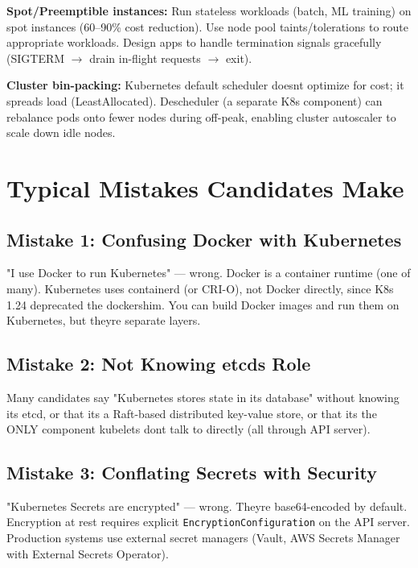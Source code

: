 \documentclass[11pt]{article}
\begin{document}
\textbf{Spot/Preemptible instances:} Run stateless workloads (batch, ML training) on spot instances (60--90\% cost reduction). Use node pool taints/tolerations to route appropriate workloads. Design apps to handle termination signals gracefully (SIGTERM \(\rightarrow\) drain in-flight requests \(\rightarrow\) exit).

\textbf{Cluster bin-packing:} Kubernetes default scheduler doesn\textquotesingle t optimize for cost; it spreads load (LeastAllocated). Descheduler (a separate K8s component) can rebalance pods onto fewer nodes during off-peak, enabling cluster autoscaler to scale down idle nodes.

\section{Typical Mistakes Candidates Make}\label{typical-mistakes-candidates-make}

\subsection{Mistake 1: Confusing Docker with Kubernetes}\label{mistake-1-confusing-docker-with-kubernetes}

"I use Docker to run Kubernetes" --- wrong. Docker is a container runtime (one of many). Kubernetes uses containerd (or CRI-O), not Docker directly, since K8s 1.24 deprecated the dockershim. You can build Docker images and run them on Kubernetes, but they\textquotesingle re separate layers.

\subsection{Mistake 2: Not Knowing etcd\textquotesingle s Role}\label{mistake-2-not-knowing-etcds-role}

Many candidates say "Kubernetes stores state in its database" without knowing it\textquotesingle s etcd, or that it\textquotesingle s a Raft-based distributed key-value store, or that it\textquotesingle s the ONLY component kubelets don\textquotesingle t talk to directly (all through API server).

\subsection{Mistake 3: Conflating Secrets with Security}\label{mistake-3-conflating-secrets-with-security}

"Kubernetes Secrets are encrypted" --- wrong. They\textquotesingle re base64-encoded by default. Encryption at rest requires explicit \texttt{EncryptionConfiguration} on the API server. Production systems use external secret managers (Vault, AWS Secrets Manager with External Secrets Operator).
\end{document}
